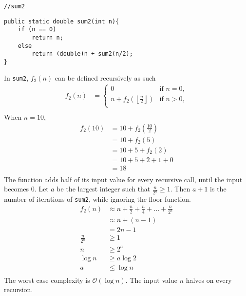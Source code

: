 \lstinline{//sum2}
\begin{lstlisting}
public static double sum2(int n){
    if (n == 0)
        return n;
    else
        return (double)n + sum2(n/2);
}
\end{lstlisting}
In \lstinline{sum2}, $f_2(n)$ can be defined recursively as such
\begin{align*}
    f_2(n) & =
    \begin{cases}
        0                                                      & \text{if \ } n=0, \\
        n+f_2\left(\left\lfloor\frac{n}{2}\right\rfloor\right) & \text{if \ } n>0, \\
    \end{cases} \\
\end{align*}
When $n=10$,
\begin{align*}
    f_2(10) & =10 + f_2\left(\frac{10}{2}\right) \\
            & =10+f_2(5)                         \\
            & =10+5+f_2(2)                       \\
            & =10+5+2+1+0                        \\
            & =18                                \\
\end{align*}
The function adds half of its input value for every recursive call, until the input becomes 0.
Let $a$ be the largest integer such that $\frac{n}{2^a}\ge1$. Then $a + 1$ is the number of iterations of \lstinline{sum2},
while ignoring the floor function.
\begin{align*}
    f_2(n)        & \approx n+\frac{n}{2}+\frac{n}{4}+\ldots+\frac{n}{2^a} \\
                  & \approx n+(n-1)                                       \\
                  & =2n-1                                                 \\
    \frac{n}{2^a} & \ge 1                                                 \\
    n             & \ge 2^a                                               \\
    \log{n}       & \ge a\log{2}                                          \\
    a             & \le \log{n}                                           \\
\end{align*}
The worst case complexity is $\mathcal{O}(\log{n})$. The input value $n$ halves on every recursion.
\clearpage

